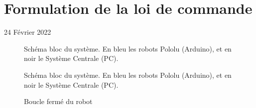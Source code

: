 \section{Formulation de la loi de commande}

\begin{flushright}
24 Février 2022
\end{flushright}

\begin{figure}[h!]
    \centering
    
    \caption{Schéma bloc du système. En bleu les robots Pololu (Arduino), et en noir le Système Centrale (PC).}
    \label{fig:formulation_commande}
\end{figure}

\begin{figure}[h!]
    \centering
    
    \caption{Schéma bloc du système. En bleu les robots Pololu (Arduino), et en noir le Système Centrale (PC).}
    \label{fig:robot}
\end{figure}

\begin{figure}[h!]
    \centering
    
    \caption{Boucle fermé du robot}
    \label{fig:robot_pid}
\end{figure}